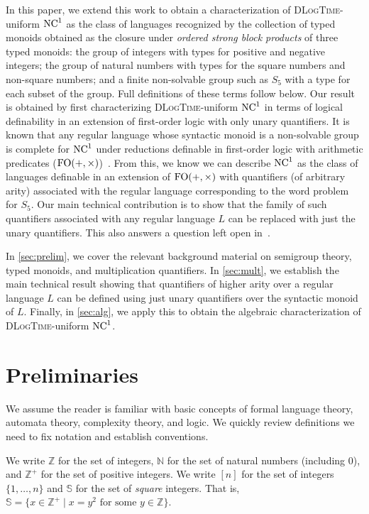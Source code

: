 \documentclass[a4paper,UKenglish,cleveref, autoref, thm-restate, anonymous]{lipics-v2021}
\begin{document}
In this paper, we extend this work to obtain a characterization of \textsc{DLogTime}-uniform $\mathrm{NC}^1$ as the class of languages recognized by the collection of typed monoids obtained as the closure under \emph{ordered strong block products} of three typed monoids: the group of integers with types for positive and negative integers; the group of natural numbers with types for the square numbers and non-square numbers; and a finite non-solvable group such as $S_5$ with a type for each subset of the group.  Full definitions of these terms follow below.  Our result is obtained by first characterizing \textsc{DLogTime}-uniform $\mathrm{NC}^1$ in terms of logical definability in an extension of first-order logic with only unary quantifiers.  It is known that any regular language whose syntactic monoid is a non-solvable group is complete for $\mathrm{NC}^1$ under reductions definable in first-order logic with arithmetic predicates ($\mathrm{FO}(+,\times)$)~\cite{barrington1990uniformity}.  From this, we know we can describe $\mathrm{NC}^1$ as the class of languages definable in an extension of $\mathrm{FO}(+,\times)$ with quantifiers (of arbitrary arity) associated with the regular language corresponding to the word problem for $S_5$.  Our main technical contribution is to show that the family of such quantifiers associated with any regular language $L$ can be replaced with just the unary quantifiers.  This also answers a question left open in~\cite{lautemann2001descriptive}.

In \autoref{sec:prelim}, we cover the relevant background material on semigroup theory, typed monoids, and multiplication quantifiers.   In \autoref{sec:mult}, we establish the main technical result showing that quantifiers of higher arity over a regular language $L$ can be defined using just unary quantifiers over the syntactic monoid of $L$.  Finally, in \autoref{sec:alg}, we apply this to obtain the algebraic characterization of \textsc{DLogTime}-uniform $\mathrm{NC}^1$.



\section{Preliminaries}\label{sec:prelim}


We assume the reader is familiar with basic concepts of formal language theory, automata theory, complexity theory, and logic.  We quickly review definitions we need to fix notation and establish conventions.

We write $\mathbb{Z}$ for the set of integers, $\mathbb{N}$ for the set of natural numbers (including $0$), and $\mathbb{Z}^+$ for the set of positive integers.
We write $[n]$ for the set of integers $\{1,\ldots,n\}$ and $\mathbb{S}$ for the set of \emph{square} integers.  That is, $\mathbb{S} = \{ x \in \mathbb{Z}^+ \mid x = y^2 \text{ for some } y \in \mathbb{Z}\}$.
\end{document}
